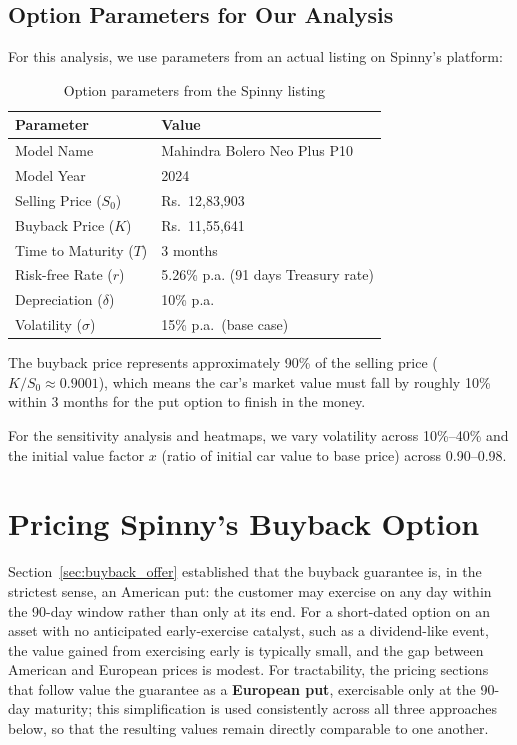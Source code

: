 \documentclass[11pt, a4paper]{article}
\begin{document}
\subsection{Option Parameters for Our Analysis}

For this analysis, we use parameters from an actual listing on Spinny's platform:

\begin{table}[H]
\centering
\caption{Option parameters from the Spinny listing}
\label{tab:params}
\begin{tabular}{@{}ll@{}}
\toprule
\textbf{Parameter} & \textbf{Value} \\
\midrule
Model Name & Mahindra Bolero Neo Plus P10 \\
Model Year & 2024 \\
Selling Price ($S_0$) & Rs.~12,83,903 \\
Buyback Price ($K$) & Rs.~11,55,641 \\
Time to Maturity ($T$) & 3 months \\
Risk-free Rate ($r$) & 5.26\% p.a. (91 days Treasury rate) \\
Depreciation ($\delta$) & 10\% p.a. \\
Volatility ($\sigma$) & 15\% p.a.\ (base case) \\
\bottomrule
\end{tabular}
\end{table}

The buyback price represents approximately 90\% of the selling price ($K/S_0 \approx 0.9001$), which means the car's market value must fall by roughly 10\% within 3 months for the put option to finish in the money.

For the sensitivity analysis and heatmaps, we vary volatility across 10\%--40\% and the initial value factor $x$ (ratio of initial car value to base price) across 0.90--0.98.


\section{Pricing Spinny's Buyback Option}

Section~\ref{sec:buyback_offer} established that the buyback guarantee is, in the strictest sense, an American put: the customer may exercise on any day within the 90-day window rather than only at its end. For a short-dated option on an asset with no anticipated early-exercise catalyst, such as a dividend-like event, the value gained from exercising early is typically small, and the gap between American and European prices is modest. For tractability, the pricing sections that follow value the guarantee as a \textbf{European put}, exercisable only at the 90-day maturity; this simplification is used consistently across all three approaches below, so that the resulting values remain directly comparable to one another.
\end{document}
